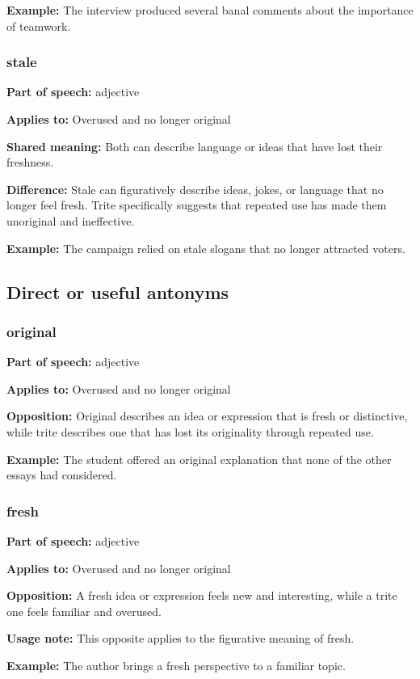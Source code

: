 \documentclass[11pt]{article}
\begin{document}
\textbf{Example:} The interview produced several banal comments about the importance of teamwork.

\subsubsection{stale}
\textbf{Part of speech:} adjective

\textbf{Applies to:} Overused and no longer original

\textbf{Shared meaning:} Both can describe language or ideas that have lost their freshness.

\textbf{Difference:} Stale can figuratively describe ideas, jokes, or language that no longer feel fresh. Trite specifically suggests that repeated use has made them unoriginal and ineffective.

\textbf{Example:} The campaign relied on stale slogans that no longer attracted voters.

\subsection{Direct or useful antonyms}
\subsubsection{original}
\textbf{Part of speech:} adjective

\textbf{Applies to:} Overused and no longer original

\textbf{Opposition:} Original describes an idea or expression that is fresh or distinctive, while trite describes one that has lost its originality through repeated use.

\textbf{Example:} The student offered an original explanation that none of the other essays had considered.

\subsubsection{fresh}
\textbf{Part of speech:} adjective

\textbf{Applies to:} Overused and no longer original

\textbf{Opposition:} A fresh idea or expression feels new and interesting, while a trite one feels familiar and overused.

\textbf{Usage note:} This opposite applies to the figurative meaning of fresh.

\textbf{Example:} The author brings a fresh perspective to a familiar topic.
\end{document}
